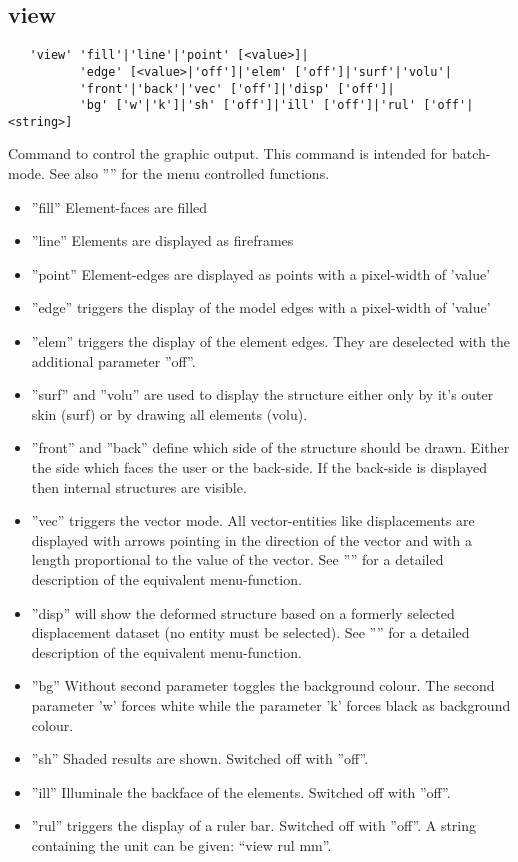 \documentclass{article}
\begin{document}
\subsection{\label{view}view}
\begin{verbatim}
   'view' 'fill'|'line'|'point' [<value>]|
          'edge' [<value>|'off']|'elem' ['off']|'surf'|'volu'|
          'front'|'back'|'vec' ['off']|'disp' ['off']|
          'bg' ['w'|'k']|'sh' ['off']|'ill' ['off']|'rul' ['off'|<string>]
\end{verbatim}
Command to control the graphic output. This command is intended for batch-mode. See also '''' for the menu controlled functions.
\begin{itemize}
\item ''fill'' Element-faces are filled 
\item ''line'' Elements are displayed as fireframes
\item ''point'' Element-edges are displayed as points with a pixel-width of 'value'
\item ''edge'' triggers the display of the model edges with a pixel-width of 'value'
\item ''elem'' triggers the display of the element edges. They are deselected with the additional parameter ''off''.
\item ''surf'' and ''volu'' are used to display the structure either only by it's outer skin (surf) or by drawing all elements (volu). \item ''front'' and ''back'' define which side of the structure should be drawn. Either the side which faces the user or the back-side. If the back-side is displayed then internal structures are visible. 
\item ''vec'' triggers the vector mode. All vector-entities like displacements are displayed with arrows pointing in the direction of the vector and with a length proportional to the value of the vector. See '''' for a detailed description of the equivalent menu-function.
\item ''disp'' will show the deformed structure based on a formerly selected displacement dataset (no entity must be selected). See '''' for a detailed description of the equivalent menu-function.
\item ''bg'' Without second parameter toggles the background colour. The second parameter 'w' forces white while the parameter 'k' forces black as background colour.
\item ''sh'' Shaded results are shown. Switched off with ''off''. 
\item ''ill'' Illuminale the backface of the elements. Switched off with ''off''. 
\item ''rul'' triggers the display of a ruler bar. Switched off with ''off''. A string containing the unit can be given: ``view rul mm''. 
\end{itemize}  
\end{document}

